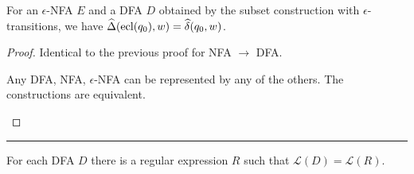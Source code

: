 \documentclass[10pt,a4paper]{article}
\begin{document}
\begin{theorem}
For an $\epsilon$-NFA $E$ and a DFA $D$ obtained by the subset construction with $\epsilon$-transitions, we have $\widehat{\Delta}(\operatorname{ecl}(q_0),w) = \widehat{\delta}(q_0,w)$.
\end{theorem}
\begin{proof}
Identical to the previous proof for NFA $\to$ DFA.

\begin{corollary}
Any DFA, NFA, $\epsilon$-NFA can be represented by any of the others. The constructions are equivalent.
\end{corollary}
\end{proof}
\hrule
\begin{theorem}
For each DFA $D$ there is a regular expression $R$ such that $\mathcal{L}(D) = \mathcal{L}(R)$.
\end{theorem}
\end{document}
